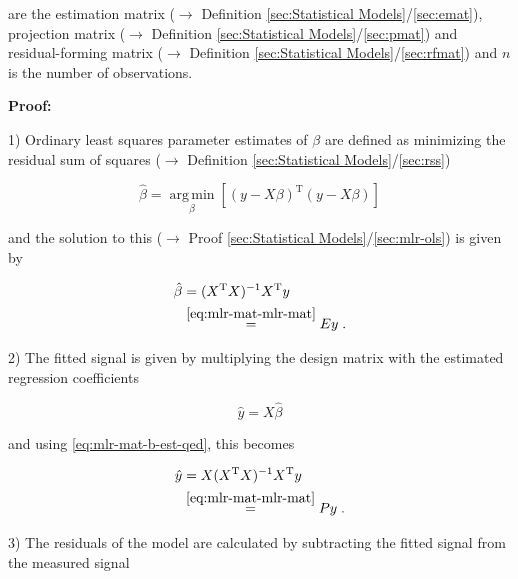 \documentclass[a4paper,12pt,twoside]{book}
\begin{document}
are the estimation matrix ($\rightarrow$ Definition \ref{sec:Statistical Models}/\ref{sec:emat}), projection matrix ($\rightarrow$ Definition \ref{sec:Statistical Models}/\ref{sec:pmat}) and residual-forming matrix ($\rightarrow$ Definition \ref{sec:Statistical Models}/\ref{sec:rfmat}) and $n$ is the number of observations.


\vspace{1em}
\textbf{Proof:}

1) Ordinary least squares parameter estimates of $\beta$ are defined as minimizing the residual sum of squares ($\rightarrow$ Definition \ref{sec:Statistical Models}/\ref{sec:rss})

\begin{equation} \label{eq:mlr-mat-ols}
\hat{\beta} = \operatorname*{arg\,min}_{\beta} \left[ (y-X\beta)^\mathrm{T} (y-X\beta) \right]
\end{equation}

and the solution to this ($\rightarrow$ Proof \ref{sec:Statistical Models}/\ref{sec:mlr-ols}) is given by

\begin{equation} \label{eq:mlr-mat-b-est-qed}
\begin{split}
\hat{\beta} &= (X^\mathrm{T} X)^{-1} X^\mathrm{T} y \\
&\overset{\eqref{eq:mlr-mat-mlr-mat}}{=} E y \; .
\end{split}
\end{equation}

\vspace{1em}
2) The fitted signal is given by multiplying the design matrix with the estimated regression coefficients

\begin{equation} \label{eq:mlr-mat-y-est}
\hat{y} = X\hat{\beta}
\end{equation}

and using \eqref{eq:mlr-mat-b-est-qed}, this becomes

\begin{equation} \label{eq:mlr-mat-y-est-qed}
\begin{split}
\hat{y} &= X (X^\mathrm{T} X)^{-1} X^\mathrm{T} y \\
&\overset{\eqref{eq:mlr-mat-mlr-mat}}{=} P y \; .
\end{split}
\end{equation}

\vspace{1em}
3) The residuals of the model are calculated by subtracting the fitted signal from the measured signal
\end{document}
